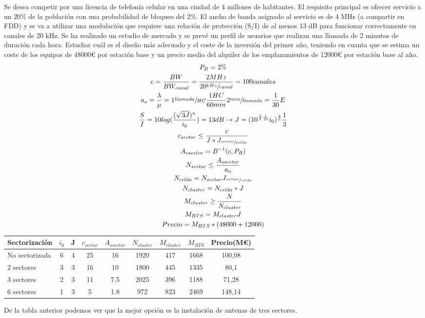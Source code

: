 \begin{exercise}[3]
	Se desea competir por una licencia de telefonía celular en una ciudad de 4 millones de habitantes. El requisito principal es ofrecer servicio a un 20\% de la población con una probabilidad de bloqueo del 2\%. El ancho de banda asignado al servicio es de 4 MHz (a compartir en FDD) y se va a utilizar una modulación que requiere una relación de protección (S/I) de al menos 13 dB para funcionar correctamente en canales de 20 kHz. Se ha realizado un estudio de mercado y se prevé un perfil de usuarios que realizan una llamada de 2 minutos de duración cada hora. Estudiar cuál es el diseño más adecuado y el coste de la inversión del primer año, teniendo en cuanta que se estima un coste de los equipos de 48000€ por estación base y un precio medio del alquiler de los emplazamientos de 12000€ por estación base al año.\\
	\begin{gather*}
		P_B=2\%\\
		c=\frac{BW}{BW_{canal}}=\frac{2MHz}{20\sfrac{kHz}{canal}}=100canales\\
		a_o=\frac{\lambda}{\mu}=1\sfrac{llamada}{HC}\frac{1HC}{60min}2\sfrac{min}{llamada}=\frac{1}{30}E\\
		\frac{S}{I}=10log(\frac{(\sqrt{3J})^n}{i_0})=13dB\to J=(10^{\frac{S}{I}\frac{1}{10}}i_0)^{\frac{2}{n}}\frac{1}{3}\\
		c_{sector}\leq\frac{c}{J*J_{\sfrac{sector}{celda}}}\\
		A_{osector}=B^{-1}(c,P_B)\\
		N_{sector}\leq\frac{A_{osector}}{a_o}\\
		N_{celda}=N_{sector}J_{\sfrac{sector}{celda}}\\
		N_{cluster}=N_{celda}*J\\
		M_{cluster}\geq\frac{N}{N_{cluster}}\\
		M_{BTS}=M_{cluster}J\\
		Precio=M_{BTS}*(48000+12000)
	\end{gather*}
	\begin{center}
	\begin{tabular}{l|c|c|c|c|c|c|c|c}
		Sectorización  	& $i_0$	& J & $c_{sector}$  & $A_{osector}$ & $N_{cluster}$ & $M_{cluster}$ 	& $M_{BTS}$ & Precio(M€) 	\\\hline
		No sectorizada 	& 6	& 4 & 25	& 16	& 1920	& 417 & 1668 & 100,08	\\\hline
		2 sectores		& 3	& 3 & 16	& 10	& 1800	& 445 & 1335 & 80,1		\\\hline
		3 sectores		& 2	& 3 & 11	& 7.5	& 2025	& 396 & 1188 & 71,28	\\\hline
		6 sectores		& 1	& 3 & 5		& 1.8	& 972	& 823 & 2469 & 148,14	\\\hline
	\end{tabular}
	\end{center}
	De la tabla anterior podemos ver que la mejor opción es la instalación de antenas de tres sectores.
\end{exercise}
